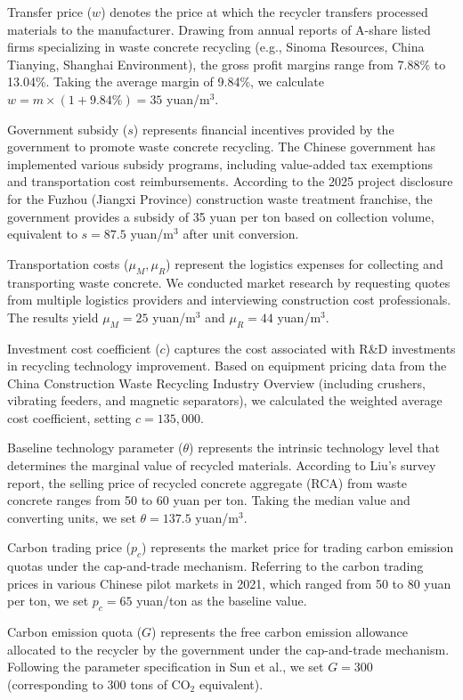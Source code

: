 \documentclass[authoryear,preprint,review,times,10pt]{elsarticle}
\begin{document}
Transfer price ($w$) denotes the price at which the recycler transfers processed materials to the manufacturer. Drawing from annual reports of A-share listed firms specializing in waste concrete recycling (e.g., Sinoma Resources, China Tianying, Shanghai Environment), the gross profit margins range from 7.88\% to 13.04\%. Taking the average margin of 9.84\%, we calculate $w = m \times (1 + 9.84\%) = 35$ yuan/m$^3$.

Government subsidy ($s$) represents financial incentives provided by the government to promote waste concrete recycling. The Chinese government has implemented various subsidy programs, including value-added tax exemptions and transportation cost reimbursements. According to the 2025 project disclosure for the Fuzhou (Jiangxi Province) construction waste treatment franchise, the government provides a subsidy of 35 yuan per ton based on collection volume, equivalent to $s = 87.5$ yuan/m$^3$ after unit conversion.

Transportation costs ($\mu_M, \mu_R$) represent the logistics expenses for collecting and transporting waste concrete. We conducted market research by requesting quotes from multiple logistics providers and interviewing construction cost professionals. The results yield $\mu_M = 25$ yuan/m$^3$ and $\mu_R = 44$ yuan/m$^3$.

Investment cost coefficient ($c$) captures the cost associated with R\&D investments in recycling technology improvement. Based on equipment pricing data from the China Construction Waste Recycling Industry Overview (including crushers, vibrating feeders, and magnetic separators), we calculated the weighted average cost coefficient, setting $c = 135,000$.

Baseline technology parameter ($\theta$) represents the intrinsic technology level that determines the marginal value of recycled materials. According to Liu's survey report, the selling price of recycled concrete aggregate (RCA) from waste concrete ranges from 50 to 60 yuan per ton. Taking the median value and converting units, we set $\theta = 137.5$ yuan/m$^3$.

Carbon trading price ($p_c$) represents the market price for trading carbon emission quotas under the cap-and-trade mechanism. Referring to the carbon trading prices in various Chinese pilot markets in 2021, which ranged from 50 to 80 yuan per ton, we set $p_c = 65$ yuan/ton as the baseline value.

Carbon emission quota ($G$) represents the free carbon emission allowance allocated to the recycler by the government under the cap-and-trade mechanism. Following the parameter specification in Sun et al., we set $G = 300$ (corresponding to 300 tons of CO$_2$ equivalent).
\end{document}

